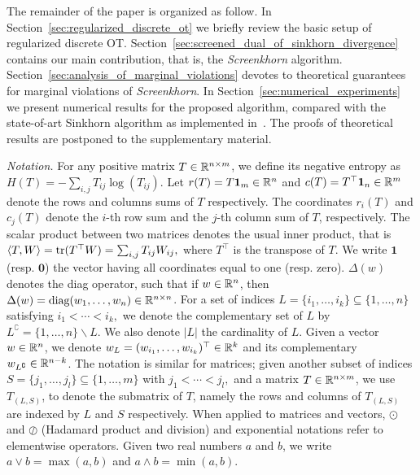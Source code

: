 
The remainder of the paper is organized as follow. In Section~\ref{sec:regularized_discrete_ot} we briefly review the basic setup of regularized discrete OT. 
Section~\ref{sec:screened_dual_of_sinkhorn_divergence} contains our main contribution, that is, the \emph{Screenkhorn} algorithm. 
Section~\ref{sec:analysis_of_marginal_violations} devotes to theoretical guarantees for marginal violations of \emph{Screenkhorn}. 
In Section~\ref{sec:numerical_experiments} we present numerical results for the proposed algorithm, compared with the state-of-art Sinkhorn algorithm as implemented in~\cite{flamary2017pot}. 
The proofs of theoretical results are postponed to the supplementary material.

\emph{Notation.} For any positive matrix $T \in {\mathbb{R}}^{n\times m}$, we define its negative entropy as $H(T) = -\sum_{i,j} T_{ij} \log(T_{ij}).$
Let $r(T) = T\mathbf 1_m \in {\mathbb{R}}^n$ and $c(T) = T^\top\mathbf 1_n \in {\mathbb{R}}^m$ denote the rows and columns sums of $T$ respectively. The coordinates $r_i(T)$ and $c_j(T)$ denote the $i$-th row sum and the $j$-th column sum of $T$, respectively.
The scalar product between two matrices denotes the usual inner product, that is $\langle T, W \rangle = \text{tr}(T^\top W) = \sum_{i,j}T_{ij}W_{ij},$ where $T^\top$ is the transpose of $T$. 
We write $\mathbf{1}$ (resp. $\mathbf{0}$) the vector having all coordinates equal to one (resp. zero).
$\Delta(w)$ denotes the diag operator, such that if $w \in {\mathbb{R}}^n$, then $\Delta(w) = \text{diag}(w_1, \ldots, w_n)\in {\mathbb{R}}^{n\times n}$.
For a set of indices $L=\{i_1, \ldots, i_k\} \subseteq \{1, \ldots, n\}$ satisfying $i_1 < \cdots <i_k,$ we denote the complementary set of $L$ by $L^\complement = \{1, \ldots, n\} \backslash L$. We also denote $|L|$ the cardinality of $L$.
Given a vector $w \in {\mathbb{R}}^n$, we denote $w_L= (w_{i_1}, \ldots, w_{i_k})^\top \in {\mathbb{R}}^k$ and its complementary $w_{L^\complement} \in {\mathbb{R}}^{n- k}$.  The notation is similar for matrices; given another subset of indices $S = \{j_1, \ldots, j_l\} \subseteq \{1, \ldots, m\}$ with $j_1 < \cdots <j_l,$ and a matrix $T\in {\mathbb{R}}^{n\times m}$, we use $T_{(L,S)}$, to denote the submatrix of $T$, namely the rows and columns of $T_{(L,S)}$ are indexed by $L$ and $S$ respectively.
When applied to matrices and vectors,  $\odot$ and $\oslash$ (Hadamard product and division) and exponential notations refer to elementwise operators.
Given two real numbers $a$ and $b$, we write $a\vee b = \max(a,b)$ and $a\wedge b = \min(a,b).$

